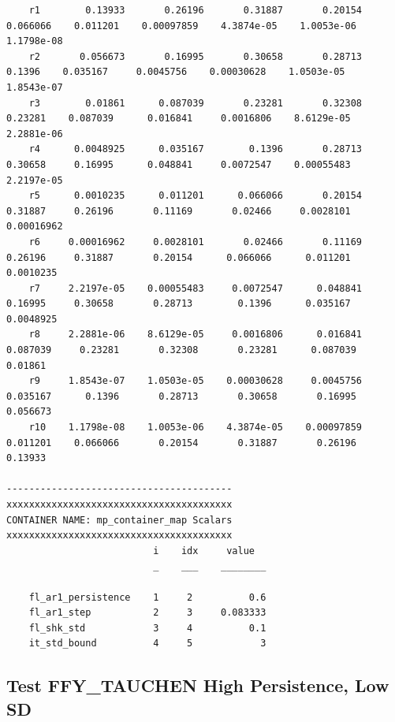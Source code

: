 \documentclass[
]{book}
\begin{document}
\begin{verbatim}
    r1        0.13933       0.26196       0.31887       0.20154    0.066066    0.011201    0.00097859    4.3874e-05    1.0053e-06    1.1798e-08
    r2       0.056673       0.16995       0.30658       0.28713      0.1396    0.035167     0.0045756    0.00030628    1.0503e-05    1.8543e-07
    r3        0.01861      0.087039       0.23281       0.32308     0.23281    0.087039      0.016841     0.0016806    8.6129e-05    2.2881e-06
    r4      0.0048925      0.035167        0.1396       0.28713     0.30658     0.16995      0.048841     0.0072547    0.00055483    2.2197e-05
    r5      0.0010235      0.011201      0.066066       0.20154     0.31887     0.26196       0.11169       0.02466     0.0028101    0.00016962
    r6     0.00016962     0.0028101       0.02466       0.11169     0.26196     0.31887       0.20154      0.066066      0.011201     0.0010235
    r7     2.2197e-05    0.00055483     0.0072547      0.048841     0.16995     0.30658       0.28713        0.1396      0.035167     0.0048925
    r8     2.2881e-06    8.6129e-05     0.0016806      0.016841    0.087039     0.23281       0.32308       0.23281      0.087039       0.01861
    r9     1.8543e-07    1.0503e-05    0.00030628     0.0045756    0.035167      0.1396       0.28713       0.30658       0.16995      0.056673
    r10    1.1798e-08    1.0053e-06    4.3874e-05    0.00097859    0.011201    0.066066       0.20154       0.31887       0.26196       0.13933

----------------------------------------
xxxxxxxxxxxxxxxxxxxxxxxxxxxxxxxxxxxxxxxx
CONTAINER NAME: mp_container_map Scalars
xxxxxxxxxxxxxxxxxxxxxxxxxxxxxxxxxxxxxxxx
                          i    idx     value  
                          _    ___    ________

    fl_ar1_persistence    1     2          0.6
    fl_ar1_step           2     3     0.083333
    fl_shk_std            3     4          0.1
    it_std_bound          4     5            3
\end{verbatim}

\hypertarget{test-ffy_tauchen-high-persistence-low-sd}{%
\subsection{Test FFY\_TAUCHEN High Persistence, Low SD}\label{test-ffy_tauchen-high-persistence-low-sd}}
\end{document}
